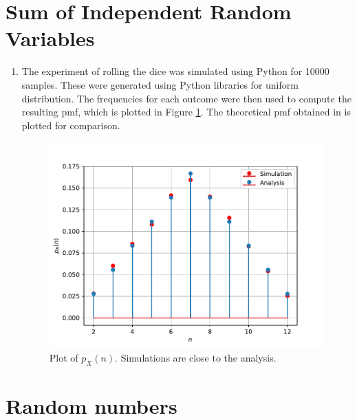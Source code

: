 \documentclass[10pt, a4paper]{article}
\begin{document}
	\maketitle
 \section{Sum of Independent Random Variables}
 \begin {enumerate}
 \item 
The experiment of rolling the dice was simulated using Python for 10000 samples.  These were generated using Python libraries for uniform distribution. The frequencies for each outcome were then used to compute the resulting pmf, which  is plotted in Figure \ref{fig:dice}.  The theoretical pmf obtained in  is plotted for comparison.  
%
\begin{figure}[!ht]
\centering
\includegraphics[scale=0.5]{images/4.1.4.pdf}
\caption{Plot of $p_X(n)$.  Simulations are close to the analysis. }
\label{fig:dice}
\end{figure}
\begin{center}
\end{center}
\end{enumerate}



	\section{Random numbers}
\end{document}
